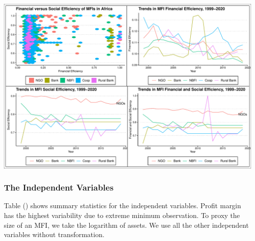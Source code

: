 \documentclass[
]{article}
\begin{document}
\newpage

\begin{landscape}

\includegraphics{finsoc_efficiency_files/figure-latex/unnamed-chunk-24-1.pdf}

\end{landscape}

\hypertarget{the-independent-variables}{%
\subsubsection{The Independent
Variables}\label{the-independent-variables}}

Table () shows summary statistics for the independent variables. Profit
margin has the highest variability due to extreme minimum observation.
To proxy the size of an MFI, we take the logarithm of assets. We use all
the other independent variables without transformation.
\end{document}

